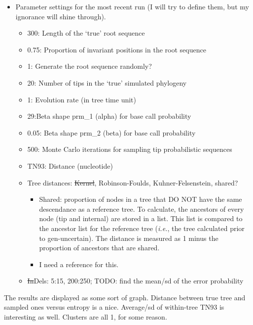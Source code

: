 \documentclass[
]{article}
\providecommand{\tightlist}{%
  \setlength{\itemsep}{0pt}\setlength{\parskip}{0pt}}
\newcommand{\ie}{\textit{i.e.},\xspace}
\begin{document}
\begin{itemize}
\tightlist
\item
  Parameter settings for the most recent run (I will try to define them,
  but my ignorance will shine through).

  \begin{itemize}
  \tightlist
  \item
    300: Length of the `true' root sequence
  \item
    0.75: Proportion of invariant positions in the root sequence
  \item
    1: Generate the root sequence randomly?
  \item
    20: Number of tips in the `true' simulated phylogeny
  \item
    1: Evolution rate (in tree time unit)
  \item
    29:Beta shape prm\_1 (alpha) for base call probability
  \item
    0.05: Beta shape prm\_2 (beta) for base call probability
  \item
    500: Monte Carlo iterations for sampling tip probabilistic sequences
  \item
    TN93: Distance (nucleotide)
  \item
    Tree distances: \sout{Kernel}, Robinson-Foulds, Kuhner-Felsenstein,
    shared?

    \begin{itemize}
    \tightlist
    \item
      Shared: proportion of nodes in a tree that DO NOT have the same
      descendance as a reference tree. To calculate, the ancestors of
      every node (tip and internal) are stored in a list. This list is
      compared to the ancestor list for the reference tree (\ie the tree
      calculated prior to gen-uncertain). The distance is measured as 1
      minus the proportion of ancestors that are shared.
    \item
      I need a reference for this.
    \end{itemize}
  \item
    \sout{In}Dels: 5:15, 200:250; TODO: find the mean/sd of the error
    probability
  \end{itemize}
\end{itemize}

The results are displayed as some sort of graph. Distance between true
tree and sampled ones versus entropy is a nice. Average/sd of
within-tree TN93 is interesting as well. Clusters are all 1, for some
reason.
\end{document}
